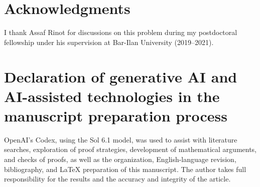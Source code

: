 \documentclass[10pt,a4paper]{amsart}
\theoremstyle{definition}
\theoremstyle{remark}
\begin{document}
\section*{Acknowledgments}
I thank Assaf Rinot for discussions on this problem during my
postdoctoral fellowship under his supervision at Bar-Ilan
University (2019--2021).

\section*{Declaration of generative AI and AI-assisted technologies
in the manuscript preparation process}
OpenAI's Codex, using the Sol 6.1 model, was used to assist
with literature searches, exploration of proof strategies,
development of mathematical arguments, and checks of proofs,
as well as the organization, English-language revision,
bibliography, and LaTeX preparation of this manuscript.
The author takes full responsibility for the results and the
accuracy and integrity of the article.
\end{document}
